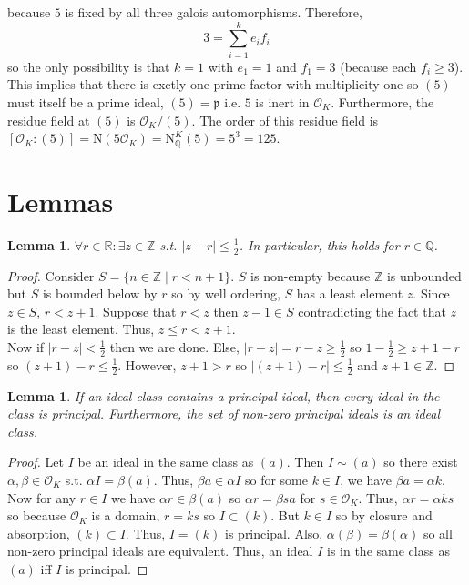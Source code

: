 \documentclass[12pt]{extarticle}
\newcommand{\Z}{\mathbb{Z}}
\newcommand{\Q}{\mathbb{Q}}
\newcommand{\R}{\mathbb{R}}
\newcommand{\ints}[1]{\mathcal{O}_{#1}}
\newcommand{\qnorm}[2]{\mathrm{N}^{#1}_{\Q}\left(#2\right)}
\newcommand{\pideal}{\mathfrak{p}}
\newtheorem{lemma}[theorem]{Lemma}
\begin{document}
\begin{enumerate}
\begin{enumerate}
because $5$ is fixed by all three galois automorphisms. Therefore,
\[3 = \sum\limits_{i = 1}^{k} e_i f_i\] so the only possibility is that $k = 1$ with $e_1 = 1$ and $f_1 = 3$ (because each $f_i \ge 3$). This implies that there is exctly one prime factor with multiplicity one so $(5)$ must itself be a prime ideal, $(5) = \pideal$ i.e. $5$ is inert in $\ints{K}$. Furthermore, the residue field at $(5)$ is $\ints{K}/(5)$. The order of this residue field is $[\ints{K} : (5)] = \mathrm{N}(5\ints{K}) = \qnorm{K}{5} = 5^3 = 125$.
\end{enumerate}

\end{enumerate}

\section*{Lemmas}


\begin{lemma} \label{approx} $\forall r \in \R : \exists z \in \Z$ s.t. $|z - r| \le \frac{1}{2}$. In particular, this holds for $r \in \Q$.
\end{lemma}
\begin{proof}
Consider $S = \{n \in \Z \mid r < n + 1 \}$. $S$ is non-empty because $\Z$ is unbounded but $S$ is bounded below by $r$ so by well ordering, $S$ has a least element $z$. Since $z \in S$, $r < z + 1$. Suppose that $r < z$ then $z - 1 \in S$ contradicting the fact that $z$ is the least element. Thus, $z \le r < z + 1$. \bigskip \\
Now if $|r - z| < \frac{1}{2}$ then we are done. Else, $|r - z| = r - z \ge \frac{1}{2}$ so $1 -  \frac{1}{2} \ge z + 1 - r$ so $(z + 1) - r \le \frac{1}{2}$. However, $z + 1 > r$ so $|(z + 1) - r| \le \frac{1}{2}$ and $z + 1 \in \Z$. 
\end{proof}

\begin{lemma} \label{idealclassprincipal} If an ideal class contains a principal ideal, then every ideal in the class is principal. Furthermore, the set of non-zero principal ideals is an ideal class.  
\end{lemma}
\begin{proof}
Let $I$ be an ideal in the same class as $(a)$. Then $I \sim (a)$ so there exist $\alpha, \beta \in \ints{K}$ s.t. $\alpha I = \beta (a)$. Thus, $\beta a \in \alpha I$ so for some $k \in I$, we have $\beta a = \alpha k$. Now for any $r \in I$ we have $\alpha r \in \beta (a)$ so $\alpha r = \beta s a$ for $s \in \ints{K}$. Thus, $\alpha r = \alpha k s$ so because $\ints{K}$ is a domain, $r = k s$ so $I \subset (k)$. But $k \in I$ so by closure and absorption, $(k) \subset I$. Thus, $I = (k)$ is principal. Also, $\alpha (\beta) = \beta (\alpha)$ so all non-zero principal ideals are equivalent. Thus, an ideal $I$ is in the same class as $(a)$ iff $I$ is principal.   
\end{proof}
\end{document}
